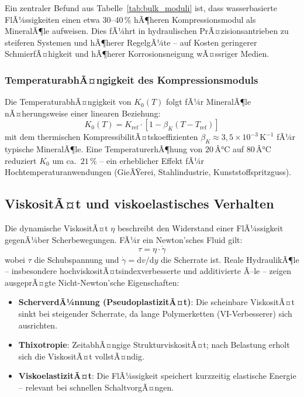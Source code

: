 ﻿\documentclass[a4paper,12pt]{scrreprt}
\theoremstyle{definition}
\begin{document}
Ein zentraler Befund aus Tabelle~\ref{tab:bulk_moduli} ist, dass wasserbasierte
FlÃ¼ssigkeiten einen etwa 30--40\,\% hÃ¶heren Kompressionsmodul als MineralÃ¶le
aufweisen. Dies fÃ¼hrt in hydraulischen PrÃ¤zisionsantrieben zu steiferen Systemen
und hÃ¶herer RegelgÃ¼te -- auf Kosten geringerer SchmierfÃ¤higkeit und hÃ¶herer
Korrosionsneigung wÃ¤ssriger Medien.

\subsubsection{TemperaturabhÃ¤ngigkeit des Kompressionsmoduls}

Die TemperaturabhÃ¤ngigkeit von $K_0(T)$ folgt fÃ¼r MineralÃ¶le nÃ¤herungsweise
einer linearen Beziehung:
\begin{equation}
  K_0(T) = K_{\mathrm{ref}} \cdot \left[1 - \beta_K (T - T_{\mathrm{ref}})\right]
  \label{eq:bulk_temp}
\end{equation}
mit dem thermischen KompressibilitÃ¤tskoeffizienten
$\beta_K \approx 3{,}5 \times 10^{-3}\,\mathrm{K}^{-1}$ fÃ¼r typische
MineralÃ¶le. Eine TemperaturerhÃ¶hung von $20\,Â°\mathrm{C}$ auf $80\,Â°\mathrm{C}$
reduziert $K_0$ um ca.\ $21\,\%$ -- ein erheblicher Effekt fÃ¼r
Hochtemperaturanwendungen (GieÃŸerei, Stahlindustrie, Kunststoffspritzguss).

\subsection{ViskositÃ¤t und viskoelastisches Verhalten}

Die dynamische ViskositÃ¤t $\eta$ beschreibt den Widerstand einer FlÃ¼ssigkeit
gegenÃ¼ber Scherbewegungen. FÃ¼r ein Newton'sches Fluid gilt:
\begin{equation}
  \tau = \eta \cdot \dot{\gamma}
  \label{eq:newton_viskos}
\end{equation}
wobei $\tau$ die Schubspannung und $\dot{\gamma} = \mathrm{d}v/\mathrm{d}y$
die Scherrate ist. Reale HydraulikÃ¶le -- insbesondere hochviskositÃ¤tsindexverbesserte
und additivierte Ã–le -- zeigen ausgeprÃ¤gte Nicht-Newton'sche Eigenschaften:

\begin{itemize}
  \item \textbf{ScherverdÃ¼nnung (PseudoplastizitÃ¤t)}: Die scheinbare ViskositÃ¤t
    sinkt bei steigender Scherrate, da lange Polymerketten (VI-Verbesserer)
    sich ausrichten.
  \item \textbf{Thixotropie}: ZeitabhÃ¤ngige StrukturviskositÃ¤t; nach Belastung
    erholt sich die ViskositÃ¤t vollstÃ¤ndig.
  \item \textbf{ViskoelastizitÃ¤t}: Die FlÃ¼ssigkeit speichert kurzzeitig
    elastische Energie -- relevant bei schnellen SchaltvorgÃ¤ngen.
\end{itemize}
\end{document}
